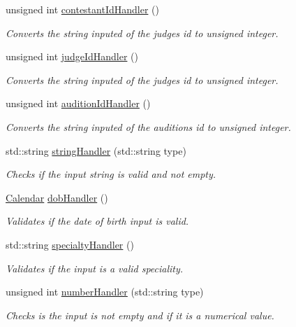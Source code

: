 \begin{DoxyCompactItemize}
unsigned int \hyperlink{class_company_m_s_a084f27a52d2be6d54c82fccca6b1461f}{contestant\+Id\+Handler} ()
\begin{DoxyCompactList}\small\item\em Converts the string inputed of the judge\textquotesingle{}s id to unsigned integer. \end{DoxyCompactList}\item 
unsigned int \hyperlink{class_company_m_s_a6955c9821dccc668c367dedc5bc9515c}{judge\+Id\+Handler} ()
\begin{DoxyCompactList}\small\item\em Converts the string inputed of the judge\textquotesingle{}s id to unsigned integer. \end{DoxyCompactList}\item 
unsigned int \hyperlink{class_company_m_s_a3cb95a890e85cb5e4b733033ae34d56a}{audition\+Id\+Handler} ()
\begin{DoxyCompactList}\small\item\em Converts the string inputed of the audition\textquotesingle{}s id to unsigned integer. \end{DoxyCompactList}\item 
std\+::string \hyperlink{class_company_m_s_ad73ecf286947e5894a53b5e205600a05}{string\+Handler} (std\+::string type)
\begin{DoxyCompactList}\small\item\em Checks if the input string is valid and not empty. \end{DoxyCompactList}\item 
\hyperlink{class_calendar}{Calendar} \hyperlink{class_company_m_s_a0018f0d192b4450e3203a581490e87ae}{dob\+Handler} ()
\begin{DoxyCompactList}\small\item\em Validates if the date of birth input is valid. \end{DoxyCompactList}\item 
std\+::string \hyperlink{class_company_m_s_a82a491843b448c0e87b91b0ba858d916}{specialty\+Handler} ()
\begin{DoxyCompactList}\small\item\em Validates if the input is a valid speciality. \end{DoxyCompactList}\item 
unsigned int \hyperlink{class_company_m_s_ada3165bd9c22018019076e810efabfbb}{number\+Handler} (std\+::string type)
\begin{DoxyCompactList}\small\item\em Checks is the input is not empty and if it is a numerical value. \end{DoxyCompactList}\item 

\end{DoxyCompactItemize}
